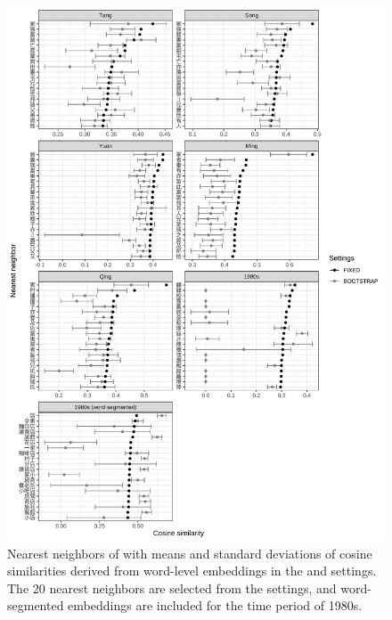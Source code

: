 \newpage
\begin{figure}[H]
  \centering
  \includegraphics[height=0.85\textheight,keepaspectratio]{figures_new/bootstrap_for_stability/neighbor_mean_and_sd_grey.pdf}
  \caption{Nearest neighbors of \jia with means and standard deviations of cosine similarities derived from word-level embeddings in the  and  settings. The 20 nearest neighbors are selected from the  settings, and word-segmented embeddings are included for the time period of 1980s.} \label{fig:bootstrap_mean_sd}
\end{figure}

